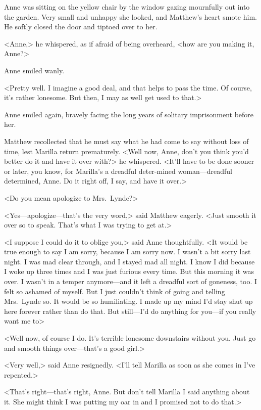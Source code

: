 Anne was sitting on the yellow chair by the window gazing mournfully out into the garden. Very small and unhappy she looked, and Matthew's heart smote him. He softly closed the door and tiptoed over to her.

<Anne,> he whispered, as if afraid of being overheard, <how are you making it, Anne?>

Anne smiled wanly.

<Pretty well. I imagine a good deal, and that helps to pass the time. Of course, it's rather lonesome. But then, I may as well get used to that.>

Anne smiled again, bravely facing the long years of solitary imprisonment before her.

Matthew recollected that he must say what he had come to say without loss of time, lest Marilla return prematurely. <Well now, Anne, don't you think you'd better do it and have it over with?> he whispered. <It'll have to be done sooner or later, you know, for Marilla's a dreadful deter-mined woman—dreadful determined, Anne. Do it right off, I say, and have it over.>

<Do you mean apologize to Mrs.~Lynde?>

<Yes—apologize—that's the very word,> said Matthew eagerly. <Just smooth it over so to speak. That's what I was trying to get at.>

<I suppose I could do it to oblige you,> said Anne thoughtfully. <It would be true enough to say I am sorry, because I am sorry now. I wasn't a bit sorry last night. I was mad clear through, and I stayed mad all night. I know I did because I woke up three times and I was just furious every time. But this morning it was over. I wasn't in a temper anymore—and it left a dreadful sort of goneness, too. I felt so ashamed of myself. But I just couldn't think of going and telling Mrs.~Lynde so. It would be so humiliating. I made up my mind I'd stay shut up here forever rather than do that. But still—I'd do anything for you—if you really want me to\longdash>

<Well now, of course I do. It's terrible lonesome downstairs without you. Just go and smooth things over—that's a good girl.>

<Very well,> said Anne resignedly. <I'll tell Marilla as soon as she comes in I've repented.>

<That's right—that's right, Anne. But don't tell Marilla I said anything about it. She might think I was putting my oar in and I promised not to do that.>

